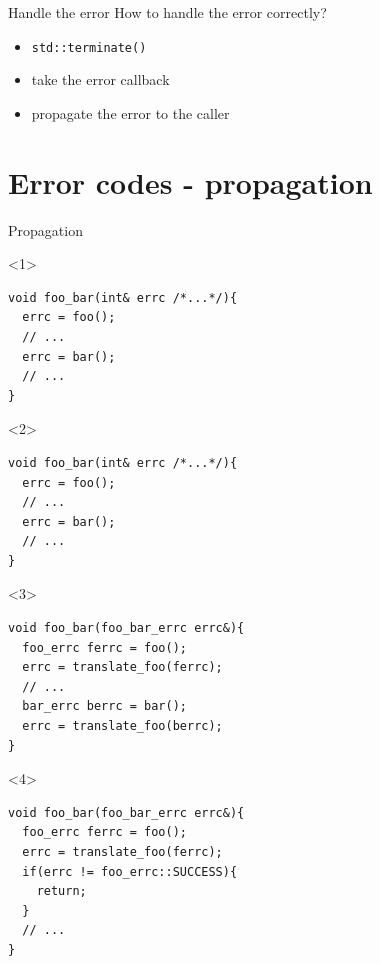 \documentclass[10pt]{beamer}
\begin{document}
\begin{frame}{Handle the error}
	How to handle the error correctly?
	
	\pause
	
	\begin{itemize}[<+- | alert@+>]
		\item \texttt{std::terminate()}
		\item take the error callback
		\item propagate the error to the caller
	\end{itemize}
	
\end{frame}

\section{Error codes - propagation}

\begin{frame}[fragile]{Propagation}

\begin{onlyenv}<1>
\begin{verbatim}
void foo_bar(int& errc /*...*/){
  errc = foo();
  // ...
  errc = bar();		
  // ...
}
	\end{verbatim}
\end{onlyenv}

\begin{onlyenv}<2>
\begin{verbatim}
void foo_bar(int& errc /*...*/){
  errc = foo();
  // ...
  errc = bar();		
  // ...
}
\end{verbatim}
\end{onlyenv}

\begin{onlyenv}<3>
\begin{verbatim}
void foo_bar(foo_bar_errc errc&){
  foo_errc ferrc = foo();
  errc = translate_foo(ferrc);
  // ...
  bar_errc berrc = bar();
  errc = translate_foo(berrc);
}
	\end{verbatim}
\end{onlyenv}

\begin{onlyenv}<4>
\begin{verbatim}
void foo_bar(foo_bar_errc errc&){
  foo_errc ferrc = foo();
  errc = translate_foo(ferrc);
  if(errc != foo_errc::SUCCESS){
  	return;
  }
  // ...
}
	\end{verbatim}
\end{onlyenv}
\end{frame}
\end{document}
